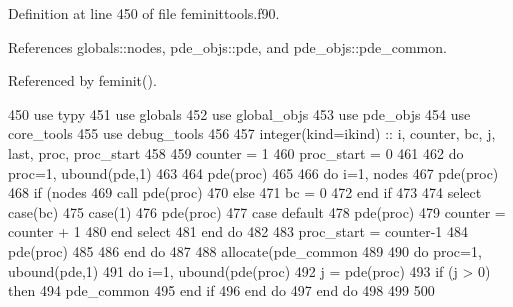 Definition at line 450 of file feminittools.\+f90.



References globals\+::nodes, pde\+\_\+objs\+::pde, and pde\+\_\+objs\+::pde\+\_\+common.



Referenced by feminit().


\begin{DoxyCode}
450         \textcolor{keywordtype}{use }typy
451         \textcolor{keywordtype}{use }globals
452         \textcolor{keywordtype}{use }global_objs
453         \textcolor{keywordtype}{use }pde_objs
454         \textcolor{keywordtype}{use }core_tools
455         \textcolor{keywordtype}{use }debug_tools
456 
457         \textcolor{keywordtype}{integer(kind=ikind)} :: i, counter, bc, j, last, proc, proc\_start
458 
459         counter = 1
460         proc\_start = 0
461         
462         \textcolor{keywordflow}{do} proc=1, ubound(pde,1)
463 
464           pde(proc)%
465 
466           \textcolor{keywordflow}{do} i=1, nodes%
467             pde(proc)%
468             \textcolor{keywordflow}{if} (nodes%
469               \textcolor{keyword}{call }pde(proc)%
470             \textcolor{keywordflow}{else}
471               bc = 0
472 \textcolor{keywordflow}{            end if}
473             
474             \textcolor{keywordflow}{select case}(bc)
475               \textcolor{keywordflow}{case}(1)
476                 pde(proc)%
477 \textcolor{keywordflow}{              case default}
478                 pde(proc)%
479                 counter  = counter + 1
480 \textcolor{keywordflow}{            end select}  
481 \textcolor{keywordflow}{          end do}
482 
483           proc\_start = counter-1
484           pde(proc)%
485 
486 \textcolor{keywordflow}{        end do}
487 
488         \textcolor{keyword}{allocate}(pde_common%
489         
490         \textcolor{keywordflow}{do} proc=1, ubound(pde,1)
491           \textcolor{keywordflow}{do} i=1, ubound(pde(proc)%
492             j = pde(proc)%
493             \textcolor{keywordflow}{if} (j > 0) \textcolor{keywordflow}{then}
494               pde_common%
495 \textcolor{keywordflow}{            end if}
496 \textcolor{keywordflow}{          end do}
497 \textcolor{keywordflow}{        end do}
498 
499 
500 
\end{DoxyCode}


